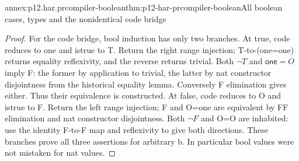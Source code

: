 \begin{annexitem}{annex:p12.har.prcompiler-boolean}{thm:p12-har-prcompiler-boolean}{All boolean cases, types and the nonidentical code bridge}
\begin{proof}
For the code bridge, bool induction has only two branches. At true,
code reduces to one and istrue to T. Return the right range injection;
T-to-(one=one) returns equality reflexivity, and the reverse returns
trivial. Both \(\neg T\) and \(\mathsf{one}=O\) imply F:
the former by application to trivial, the latter by nat constructor
disjointness from the historical equality lemma. Conversely F
elimination gives either. Thus their equivalence is constructed. At
false, code reduces to O and istrue to F. Return the left range
injection; F and O=one are equivalent by FF elimination and nat
constructor disjointness. Both \(\neg F\) and O=O are inhabited:
use the identity F-to-F map and reflexivity to give both directions.
These branches prove all three assertions for arbitrary b. In
particular bool values were not mistaken for nat values.
\end{proof}
\end{annexitem}

